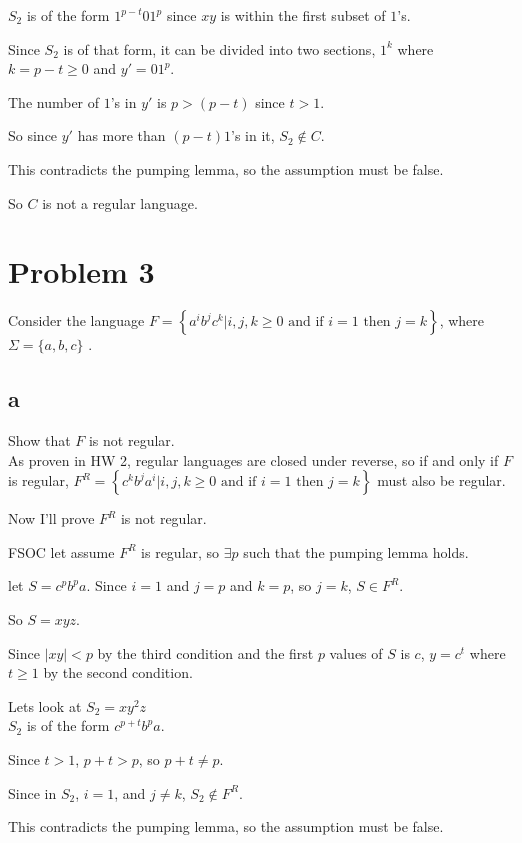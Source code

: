 \documentclass[letterpaper, 11pt]{article}
\begin{document}
$S_2$ is of the form $1^{p-t}01^{p}$ since $xy$ is within the first subset of $1$'s.
 
Since $S_2$ is of that form, it can be divided into two sections, $1^k$ where $k = p-t \geq 0$ and $y' = 01^{p}$.

The number of $1$'s in $y'$ is $p > (p-t)$ since $t > 1$.

So since $y'$ has more than $(p-t) 1$'s in it, $S_2 \notin C$.

This contradicts the pumping lemma, so the assumption must be false.

So $C$ is not a regular language.

\newpage
\section*{Problem 3}
Consider the language $F = \left\{ a ^ { i } b ^ { j } c ^ { k } | i , j , k \geq 0 \text { and if } i = 1 \text { then } j = k \right\}$, where $\Sigma = \{ a , b , c \}$ .
\subsection*{a}
Show that $F$ is not regular.\\

As proven in HW 2, regular languages are closed under reverse, so if and only if $F$ is regular, $F^R = \left\{ c ^ { k } b ^ { j } a ^ { i } | i , j , k \geq 0 \text { and if } i = 1 \text { then } j = k \right\}$ must also be regular.

Now I'll prove $F^R$ is not regular.

FSOC let assume $F^R$ is regular, so $\exists p$ such that the pumping lemma holds.

let $S = c^pb^pa$. Since $i = 1$ and $j = p$ and $k = p$, so $j = k$, $S \in F^R$.

So $S = xyz$.

Since $|xy| < p$ by the third condition and the first $p$ values of $S$ is $c$, $y = c^t$ where $t \geq 1$ by the second condition.

Lets look at $S_2 = xy^2z$\\

$S_2$ is of the form $c^{p+t}b^pa$.

Since $t > 1$, $p+t > p$, so $p+t \neq p$.

Since in $S_2$, $i = 1$, and $j \neq k$, $S_2 \notin F^R$.

This contradicts the pumping lemma, so the assumption must be false.
\end{document}
